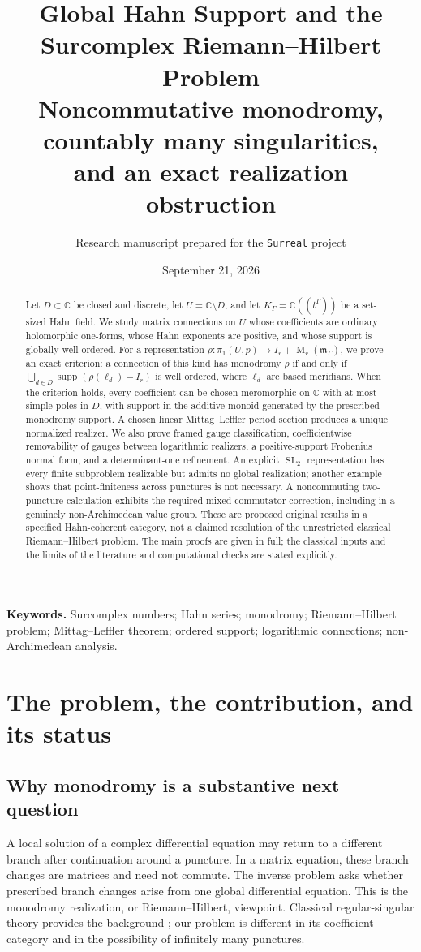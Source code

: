 \documentclass[11pt,letterpaper]{article}
\title{\vspace{-1.1cm}\textbf{Global Hahn Support and the\\ Surcomplex Riemann--Hilbert Problem}\\[7pt]
\large Noncommutative monodromy, countably many singularities,\\and an exact realization obstruction}
\author{Research manuscript prepared for the \texttt{Surreal} project}
\date{September 21, 2026}
\numberwithin{equation}{section}
\theoremstyle{definition}
\theoremstyle{remark}
\newcommand{\C}{\mathbb C}
\newcommand{\supp}{\operatorname{supp}}
\newcommand{\SL}{\operatorname{SL}}
\newcommand{\Mat}{\operatorname{M}}
\begin{document}
\maketitle
\begin{abstract}
Let $D\subset\C$ be closed and discrete, let $U=\C\setminus D$, and let
$K_\Gamma=\C((t^\Gamma))$ be a set-sized Hahn field. We study matrix connections
on $U$ whose coefficients are ordinary holomorphic one-forms, whose Hahn
exponents are positive, and whose support is globally well ordered. For a
representation $\rho:\pi_1(U,p)\to I_r+\Mat_r(\mathfrak m_\Gamma)$, we prove an
exact criterion: a connection of this kind has monodromy $\rho$ if and only if
$\bigcup_{d\in D}\supp(\rho(\ell_d)-I_r)$ is well ordered, where $\ell_d$ are
based meridians. When the criterion holds, every coefficient can be chosen
meromorphic on $\C$ with at most simple poles in $D$, with support in the
additive monoid generated by the prescribed monodromy support. A chosen
linear Mittag--Leffler period section produces a unique normalized realizer.
We also prove framed gauge classification, coefficientwise removability of
gauges between logarithmic realizers, a positive-support Frobenius normal
form, and a determinant-one refinement. An explicit $\SL_2$ representation
has every finite subproblem realizable but admits no global realization;
another example shows that point-finiteness across punctures is not necessary.
A noncommuting two-puncture calculation exhibits the required mixed
commutator correction, including in a genuinely non-Archimedean value group.
These are proposed original results in a specified Hahn-coherent category,
not a claimed resolution of the unrestricted classical Riemann--Hilbert
problem. The main proofs are given in full; the classical inputs and the
limits of the literature and computational checks are stated explicitly.
\end{abstract}

\noindent\textbf{Keywords.} Surcomplex numbers; Hahn series; monodromy;
Riemann--Hilbert problem; Mittag--Leffler theorem; ordered support;
logarithmic connections; non-Archimedean analysis.

\clearpage
\tableofcontents
\clearpage

\section{The problem, the contribution, and its status}\label{sec:intro}

\subsection{Why monodromy is a substantive next question}
A local solution of a complex differential equation may return to a different
branch after continuation around a puncture. In a matrix equation, these
branch changes are matrices and need not commute. The inverse problem asks
whether prescribed branch changes arise from one global differential
equation. This is the monodromy realization, or Riemann--Hilbert, viewpoint.
Classical regular-singular theory provides the background
\cite{deligne,ilyashenko}; our problem is different in its coefficient
category and in the possibility of infinitely many punctures.
\end{document}
